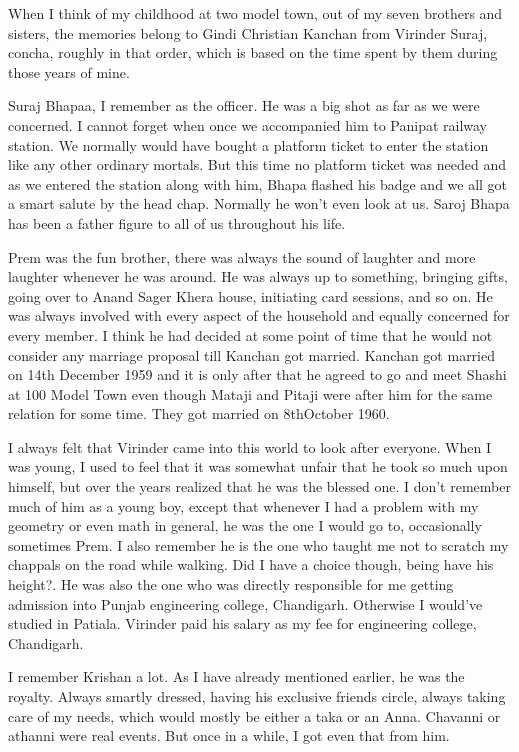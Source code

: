 When I think of my childhood at two model town, out of my seven brothers and sisters, the memories belong to Gindi Christian Kanchan from Virinder Suraj, concha, roughly in that order, which is based on the time spent by them during those years of mine.

Suraj Bhapaa, I remember as the officer. He was a big shot as far as we were concerned. I cannot forget when once we accompanied him to Panipat railway station. We normally would have bought a platform ticket to enter the station like any other ordinary mortals. But this time no platform ticket was needed and as we entered the station along with him, Bhapa flashed his badge and we all got a smart salute by the head chap. Normally he won’t even look at us. Saroj Bhapa has been a father figure to all of us throughout his life.

Prem was the fun brother, there was always the sound of laughter and more laughter whenever he was around. He was always up to something, bringing gifts, going over to Anand Sager Khera house, initiating card sessions, and so on. He was always involved with every aspect of the household and equally concerned for every member. I think he had decided at some point of time that he would not consider any marriage proposal till Kanchan got married. Kanchan got married on 14th December 1959 and it is only after that he agreed to go and meet Shashi at 100 Model Town even though Mataji and Pitaji were after him for the same relation for some time. They got married on 8thOctober 1960.

I always felt that Virinder came into this world to look after everyone. When I was young, I used to feel that it was somewhat unfair that he took so much upon himself, but over the years realized that he was the blessed one. I don’t remember much of him as a young boy, except that whenever I had a problem with my geometry or even math in general, he was the one I would go to, occasionally sometimes Prem. I also remember he is the one who taught me not to scratch my chappals on the road while walking. Did I have a choice though, being have his height?. He was also the one who was directly responsible for me getting admission into Punjab engineering college, Chandigarh. Otherwise I would’ve studied in Patiala. Virinder paid his salary as my fee for engineering college, Chandigarh.

I remember Krishan a lot. As I have already mentioned earlier, he was the royalty. Always smartly dressed, having his exclusive friends circle, always taking care of my needs, which would mostly be either a taka or an Anna. Chavanni or athanni were real events. But once in a while, I got even that from him.

